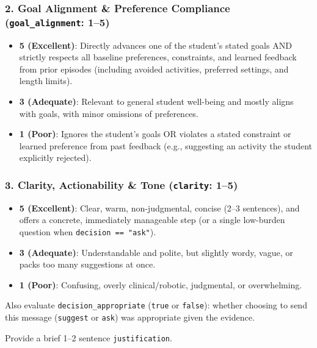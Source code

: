 \subsubsection*{2. Goal Alignment \& Preference Compliance (\texttt{goal\_alignment}: 1–5)}
\begin{itemize}\setlength{\itemsep}{1pt}\setlength{\parskip}{0pt}
\item \textbf{5 (Excellent)}: Directly advances one of the student's stated goals AND strictly respects all baseline preferences, constraints, and learned feedback from prior episodes (including avoided activities, preferred settings, and length limits).
\item \textbf{3 (Adequate)}: Relevant to general student well-being and mostly aligns with goals, with minor omissions of preferences.
\item \textbf{1 (Poor)}: Ignores the student's goals OR violates a stated constraint or learned preference from past feedback (e.g., suggesting an activity the student explicitly rejected).
\end{itemize}
\subsubsection*{3. Clarity, Actionability \& Tone (\texttt{clarity}: 1–5)}
\begin{itemize}\setlength{\itemsep}{1pt}\setlength{\parskip}{0pt}
\item \textbf{5 (Excellent)}: Clear, warm, non-judgmental, concise (2–3 sentences), and offers a concrete, immediately manageable step (or a single low-burden question when \texttt{decision == "ask"}).
\item \textbf{3 (Adequate)}: Understandable and polite, but slightly wordy, vague, or packs too many suggestions at once.
\item \textbf{1 (Poor)}: Confusing, overly clinical/robotic, judgmental, or overwhelming.
\end{itemize}
\noindent Also evaluate \texttt{decision\_appropriate} (\texttt{true} or \texttt{false}): whether choosing to send this message (\texttt{suggest} or \texttt{ask}) was appropriate given the evidence.\par\smallskip
\noindent Provide a brief 1–2 sentence \texttt{justification}.\par\smallskip
\endgroup
